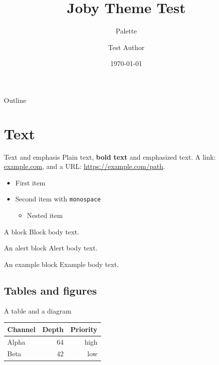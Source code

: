 \title{Joby Theme Test}
\subtitle{Palette \texttt{\jobytestpalette}}
\author{Test Author}
\date{\today}



\maketitle

\begin{frame}{Outline}
	\tableofcontents
\end{frame}

\section{Text}

\begin{frame}{Text and emphasis}
	Plain text, \textbf{bold text} and \alert{emphasized text}.
	A link: \href{https://example.com}{example.com}, and a URL: \url{https://example.com/path}.
	\begin{itemize}
		\item First item
		\item Second item with \texttt{monospace}
		\begin{itemize}
			\item Nested item
		\end{itemize}
	\end{itemize}
	\begin{block}{A block}
		Block body text.
	\end{block}
	\begin{alertblock}{An alert block}
		Alert body text.
	\end{alertblock}
	\begin{exampleblock}{An example block}
		Example body text.
	\end{exampleblock}
\end{frame}

\subsection{Tables and figures}

\begin{frame}{A table and a diagram}
	\begin{tabular}{lrr}
		\hline
		Channel & Depth & Priority \\
		\hline
		Alpha & 64 & high \\
		Beta & 42 & low \\
		\hline
	\end{tabular}
	\hfill
\end{frame}

